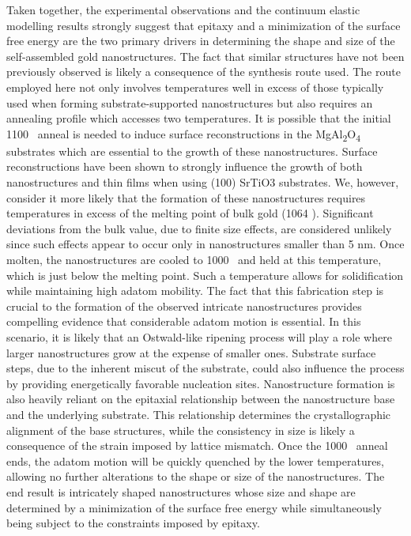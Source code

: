 Taken together, the experimental observations and the
continuum elastic modelling results strongly suggest that
epitaxy and a minimization of the surface free energy are
the two primary drivers in determining the shape and size
of the self-assembled gold nanostructures. The fact that
similar structures have not been previously observed is likely
a consequence of the synthesis route used. The route employed here not only involves temperatures well in excess
of those typically used when forming substrate-supported
nanostructures but also requires an annealing profile which
accesses two temperatures. It is possible that the initial 1100 \celsius~anneal is needed to induce surface reconstructions in the
MgAl\textsubscript{2}O\textsubscript{4} substrates which are essential to the growth of these
nanostructures. Surface reconstructions have been shown to
strongly influence the growth of both nanostructures\cite{RefWorks:24,RefWorks:16,RefWorks:104}
and thin films\cite{Neretina2009a} when using (100) SrTiO3 substrates. We,
however, consider it more likely that the formation of these
nanostructures requires temperatures in excess of the melting
point of bulk gold (1064 \celsius). Significant deviations from
the bulk value, due to finite size effects, are considered
unlikely since such effects appear to occur only in nanostructures smaller than 5 nm\cite{RefWorks:43}. Once molten, the nanostructures are cooled to 1000 \celsius~and held at this temperature,
which is just below the melting point. Such a temperature
allows for solidification while maintaining high adatom
mobility. The fact that this fabrication step is crucial to the
formation of the observed intricate nanostructures provides
compelling evidence that considerable adatom motion is
essential. In this scenario, it is likely that an Ostwald-like
ripening process will play a role where larger nanostructures
grow at the expense of smaller ones. Substrate surface steps,
due to the inherent miscut of the substrate\cite{RefWorks:69}, could also
influence the process by providing energetically favorable
nucleation sites. Nanostructure formation is also heavily
reliant on the epitaxial relationship between the nanostructure
base and the underlying substrate. This relationship determines the crystallographic alignment of the base structures,
while the consistency in size is likely a consequence of the
strain imposed by lattice mismatch. Once the 1000 \celsius~anneal
ends, the adatom motion will be quickly quenched by the
lower temperatures, allowing no further alterations to the
shape or size of the nanostructures. The end result is
intricately shaped nanostructures whose size and shape are
determined by a minimization of the surface free energy
while simultaneously being subject to the constraints imposed
by epitaxy.
